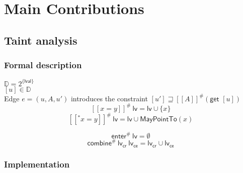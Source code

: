 
\chapter{Main Contributions}\label{chapter:mainContributions}

  \section{Taint analysis}
    
    \subsection{Formal description}

    $\mathbb{D} = 2^{\{\textsf{lval}\}}$\\
    $[u] \in \mathbb{D}$\\
    Edge $e = (u, A, u')$ introduces the constraint $[u'] \sqsupseteq [\![  A ]\!] ^{\#}  (\textsf{get } [u]) $\\
    
    \[ [\![ x = y ]\!] ^{\#}\ \textsf{lv} =  \textsf{lv} \cup \{x\} \]
    \[ [\![ ^*x = y ]\!] ^{\#}\ \textsf{lv} =  \textsf{lv} \cup \textsf{MayPointTo}(x) \]
    
    \[ \textsf{enter}^{\#}\ \textsf{lv} = \emptyset\]
    \[ \textsf{combine}^{\#}\ \textsf{lv}_\textsf{cr}\ \textsf{lv}_\textsf{ce} = \textsf{lv}_\textsf{cr} \cup \textsf{lv}_\textsf{ce} \]


    \subsection{Implementation}

